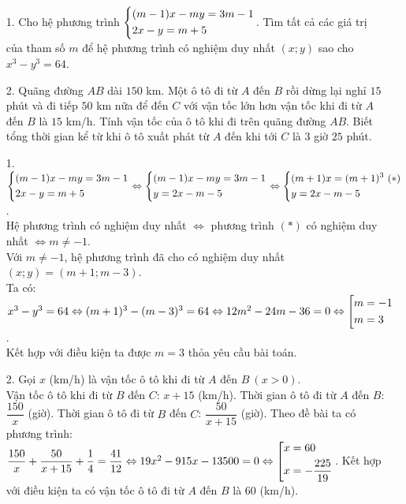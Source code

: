\begin{ex}%
\hfill
    \begin{enumerate}
        \item[1.] Cho hệ phương trình $\left\{\begin{aligned}&(m-1)x-my=3m-1\\&2x-y=m+5\end{aligned}\right.$. Tìm tất cả các giá trị của tham số $m$ để hệ phương trình có nghiệm duy nhất $(x;y)$ sao cho $x^3-y^3=64$.
        \item[2.] Quãng đường $AB$ dài $150$ km. Một ô tô đi từ $A$ đến $B$ rồi dừng lại nghỉ $15$ phút và đi tiếp $50$ km nữa để đến $C$ với vận tốc lớn hơn vận tốc khi đi từ $A$ đến $B$ là $15$ km/h. Tính vận tốc của ô tô khi đi trên quãng đường $AB$. Biết tổng thời gian kể từ khi ô tô xuất phát từ $A$ đến khi tới $C$ là $3$ giờ $25$ phút.
    \end{enumerate}
\loigiai
    {
    \begin{enumerate}
        \item[1.] $\left\{\begin{aligned}&(m-1)x-my=3m-1\\&2x-y=m+5\end{aligned}\right.\Leftrightarrow \left\{\begin{aligned}&(m-1)x-my=3m-1\\&y=2x-m-5\end{aligned}\right.\Leftrightarrow \left\{\begin{aligned}&(m+1)x=(m+1)^3\ (*)\\&y=2x-m-5\end{aligned}\right.$.\\
        Hệ phương trình có nghiệm duy nhất $\Leftrightarrow $ phương trình $(*)$ có nghiệm duy nhất $\Leftrightarrow m\ne -1$.\\
        Với $m\ne -1$, hệ phương trình đã cho có nghiệm duy nhất $(x;y)=(m+1;m-3)$.\\
        Ta có: $x^3-y^3=64\Leftrightarrow (m+1)^3-(m-3)^3=64\Leftrightarrow 12m^2-24m-36=0\Leftrightarrow \left[\begin{aligned}&m=-1\\&m=3\end{aligned}\right.$.\\
        Kết hợp với điều kiện ta được $m=3$ thỏa yêu cầu bài toán.
        \item[2.] Gọi $x$ (km/h) là vận tốc ô tô khi đi từ $A$ đến $B\ (x>0)$.\\
        Vận tốc ô tô khi đi từ $B$ đến $C$: $x+15$ (km/h).
        Thời gian ô tô đi từ $A$ đến $B$: $\dfrac{150}{x}$ (giờ).
        Thời gian ô tô đi từ $B$ đến $C$: $\dfrac{50}{x+15}$ (giờ).
        Theo đề bài ta có phương trình:\\ 
        $\dfrac{150}{x}+\dfrac{50}{x+15}+\dfrac{1}{4}=\dfrac{41}{12}\Leftrightarrow 19x^2-915x-13500=0\Leftrightarrow \left[\begin{aligned}&x=60\\&x=-\dfrac{225}{19}\end{aligned}\right.$.
        Kết hợp với điều kiện ta có vận tốc ô tô đi từ $A$ đến $B$ là $60$ (km/h).
    \end{enumerate}
    }
\end{ex}
